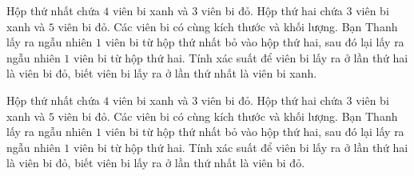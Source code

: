 \begin{bt}%
	Hộp thứ nhất chứa $4$ viên bi xanh và $3$ viên bi đỏ. Hộp thứ hai chứa $3$ viên bi xanh và $5$ viên bi đỏ. Các viên bi có cùng kích thước và khối lượng. Bạn Thanh lấy ra ngẫu nhiên $1$ viên bi từ hộp thứ nhất bỏ vào hộp thứ hai, sau đó lại lấy ra ngẫu nhiên $1$ viên bi từ hộp thứ hai. Tính xác suất để viên bi lấy ra ở lần thứ hai là viên bi đỏ, biết viên bi lấy ra ở lần thứ nhất là viên bi xanh.
\end{bt}

\begin{bt}%
	Hộp thứ nhất chứa $4$ viên bi xanh và $3$ viên bi đỏ. Hộp thứ hai chứa $3$ viên bi xanh và $5$ viên bi đỏ. Các viên bi có cùng kích thước và khối lượng. Bạn Thanh lấy ra ngẫu nhiên $1$ viên bi từ hộp thứ nhất bỏ vào hộp thứ hai, sau đó lại lấy ra ngẫu nhiên $1$ viên bi từ hộp thứ hai. Tính xác suất để viên bi lấy ra ở lần thứ hai là viên bi đỏ, biết viên bi lấy ra ở lần thứ nhất là viên bi đỏ.
\end{bt}

